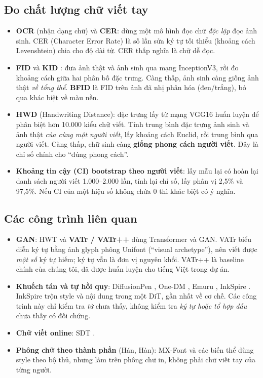 \documentclass[11pt,a4paper]{article}
\begin{document}
\subsection{Đo chất lượng chữ viết tay}
\label{sec:bg-metrics}
\begin{itemize}
\item \textbf{OCR} (nhận dạng chữ) và \textbf{CER}: dùng một mô hình đọc chữ \emph{độc lập} đọc ảnh sinh. CER (Character Error Rate) là số lần sửa ký tự tối thiểu (khoảng cách Levenshtein) chia cho độ dài từ. CER thấp nghĩa là chữ dễ đọc.
\item \textbf{FID} \cite{heusel2017} và \textbf{KID} \cite{binkowski2018}: đưa ảnh thật và ảnh sinh qua mạng InceptionV3, rồi đo khoảng cách giữa hai phân bố đặc trưng. Càng thấp, ảnh sinh càng giống ảnh thật \emph{về tổng thể}. \textbf{BFID} là FID trên ảnh đã nhị phân hóa (đen/trắng), bỏ qua khác biệt về màu nền.
\item \textbf{HWD} \cite{pippi2023hwd} (Handwriting Distance): đặc trưng lấy từ mạng VGG16 huấn luyện để phân biệt hơn 10.000 kiểu chữ viết. Tính trung bình đặc trưng ảnh sinh và ảnh thật \emph{của cùng một người viết}, lấy khoảng cách Euclid, rồi trung bình qua người viết. Càng thấp, chữ sinh càng \textbf{giống phong cách người viết}. Đây là chỉ số chính cho ``đúng phong cách''.
\item \textbf{Khoảng tin cậy (CI) bootstrap theo người viết}: lấy mẫu lại có hoàn lại danh sách người viết 1.000--2.000 lần, tính lại chỉ số, lấy phân vị 2,5\% và 97,5\%. Nếu CI của một hiệu số không chứa 0 thì khác biệt có ý nghĩa.
\end{itemize}

\subsection{Các công trình liên quan}
\begin{itemize}
\item \textbf{GAN}: HWT \cite{bhunia2021hwt} và \textbf{VATr / VATr++} \cite{pippi2023vatr,vanherle2024vatrpp} dùng Transformer và GAN. VATr biểu diễn ký tự bằng ảnh glyph phông Unifont (``visual archetype''), nên viết được \emph{một số} ký tự hiếm; ký tự vẫn là đơn vị nguyên khối. VATr++ là baseline chính của chúng tôi, đã được huấn luyện cho tiếng Việt trong dự án.
\item \textbf{Khuếch tán và tự hồi quy}: DiffusionPen \cite{nikolaidou2024}, One-DM \cite{dai2024onedm}, Emuru \cite{pippi2025emuru}, InkSpire \cite{inkspire2026}. InkSpire trộn style và nội dung trong một DiT, gần nhất về cơ chế. Các công trình này chỉ kiểm tra \emph{từ} chưa thấy, không kiểm tra \emph{ký tự hoặc tổ hợp dấu} chưa thấy có đối chứng.
\item \textbf{Chữ viết online}: SDT \cite{dai2023sdt}.
\item \textbf{Phông chữ theo thành phần} (Hán, Hàn): MX-Font và các biến thể dùng style theo bộ thủ, nhưng làm trên phông chữ in, không phải chữ viết tay của từng người.
\end{itemize}
\end{document}
